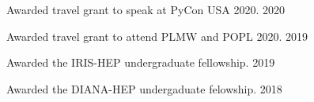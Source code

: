 \documentclass[10pt, letterpaper]{deps1}
\begin{document}
%
%

%
%
\begin{tightitemize}
    \item Awarded travel grant to speak at PyCon USA 2020. \hfill{2020}
    \item Awarded travel grant to attend PLMW and POPL 2020. \hfill{2019}
    \item Awarded the IRIS-HEP undergraduate fellowship. \hfill{2019}
	\item Awarded the DIANA-HEP undergaduate felowship. \hfill{2018}
\end{tightitemize}
\end{document}
